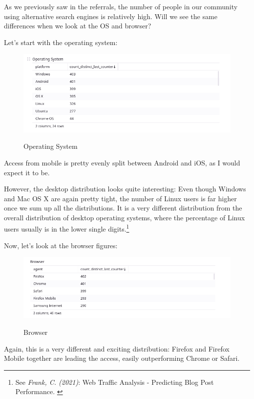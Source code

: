 As we previously saw in the referrals, the number of people in our community using alternative search engines is relatively high. Will we see the same differences when we look at the OS and browser?

Let's start with the operating system:

\begin{figure}[H]
\centering
\caption {Operating System}
\includegraphics[width=\linewidth]{images/figure08.png}
\label{fig:operatingSystem}
\end{figure}

Access from mobile is pretty evenly split between Android and iOS, as I would expect it to be. 

However, the desktop distribution looks quite interesting: Even though Windows and Mac OS X are again pretty tight, the number of Linux users is far higher once we sum up all the distributions. It is a very different distribution from the overall distribution of desktop operating systems, where the percentage of Linux users usually is in the lower single digits.\footnote{See \textit{Frank, C. (2021)}: Web Traffic Analysis - Predicting Blog Post Performance. \cite{previousBigData}}

Now, let's look at the browser figures:

\begin{figure}[H]
\centering
\caption {Browser}
\includegraphics[width=\linewidth]{images/figure09.png}
\label{fig:browser}
\end{figure}

Again, this is a very different and exciting distribution: Firefox and Firefox Mobile together are leading the access, easily outperforming Chrome or Safari. 

